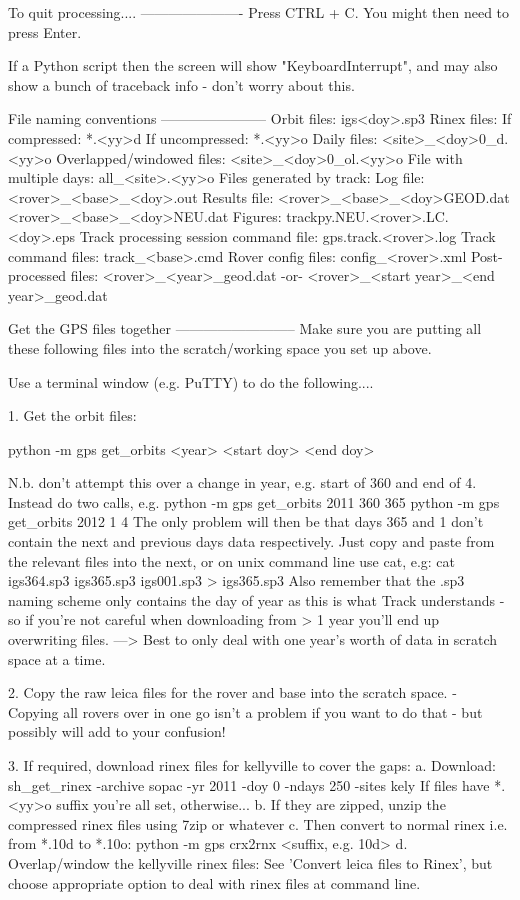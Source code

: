\documentclass[11pt]{article} %
\begin{document}
To quit processing....
----------------------
Press CTRL + C. You might then need to press Enter. 

If a Python script then the screen will show "KeyboardInterrupt", and may also show a bunch of traceback info - don't worry about this.


File naming conventions
-----------------------
Orbit files: igs<doy>.sp3
Rinex files:
	If compressed: *.<yy>d
	If uncompressed: *.<yy>o
	Daily files: <site>_<doy>0_d.<yy>o
	Overlapped/windowed files: <site>_<doy>0_ol.<yy>o
	File with multiple days: all_<site>.<yy>o
Files generated by track:
	Log file: <rover>_<base>_<doy>.out
	Results file: <rover>_<base>_<doy>GEOD.dat
				  <rover>_<base>_<doy>NEU.dat
    Figures: trackpy.NEU.<rover>.LC.<doy>.eps
Track processing session command file: gps.track.<rover>.log	
Track command files: track_<base>.cmd
Rover config files: config_<rover>.xml
Post-processed files: <rover>_<year>_geod.dat -or- 
					  <rover>_<start year>_<end year>_geod.dat
	


Get the GPS files together
--------------------------
Make sure you are putting all these following files into the scratch/working space you set up above.

Use a terminal window (e.g. PuTTY) to do the following....

1. Get the orbit files:

	 python -m gps get_orbits <year> <start doy> <end doy>
	 
   N.b. don't attempt this over a change in year, e.g. start of 360 and end of 4. Instead do two calls, e.g.
	 python -m gps get_orbits 2011 360 365
	 python -m gps get_orbits 2012 1 4
   The only problem will then be that days 365 and 1 don't contain the next and previous days data respectively.
   Just copy and paste from the relevant files into the next, or on unix command line use cat, e.g:
		cat igs364.sp3 igs365.sp3 igs001.sp3 > igs365.sp3
   Also remember that the .sp3 naming scheme only contains the day of year as this is what Track understands -
   so if you're not careful when downloading from > 1 year you'll end up overwriting files.
   ---> Best to only deal with one year's worth of data in scratch space at a time.
   
2. Copy the raw leica files for the rover and base into the scratch space.
	- Copying all rovers over in one go isn't a problem if you want to do that - but possibly will add to your confusion!
	
3. If required, download rinex files for kellyville to cover the gaps:   
 a. Download: 
		sh_get_rinex -archive sopac -yr 2011 -doy 0 -ndays 250 -sites kely
	If files have *.<yy>o suffix you're all set, otherwise...	
 b. If they are zipped, unzip the compressed rinex files using 7zip or whatever
 c. Then convert to normal rinex i.e. from *.10d to *.10o:
	    python -m gps crx2rnx <suffix, e.g. 10d>
 d. Overlap/window the kellyville rinex files:
      See 'Convert leica files to Rinex', but choose appropriate option to deal with rinex files at command line.
		
\end{document}
